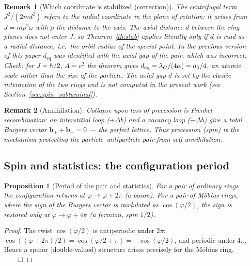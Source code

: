 \documentclass[12pt,a4paper]{article}
\newtheorem{proposition}{Proposition}
\newtheorem{remark}{Remark}
\providecommand{\lambdabar}{{\mkern0.75mu\mathchar'26\mkern-9.75mu\lambda}}
\begin{document}
\begin{remark}[Which coordinate is stabilized (correction)]
\label{rem:stab_axis}
The centrifugal term $J^2/(2md^2)$ refers to the \emph{radial} coordinate in the
plane of rotation: it arises from $J=m\rho^2\omega$ with $\rho$ the distance to
the axis. The axial distance $d$ between the ring planes does not enter $J$, so
Theorem~\ref{th:stab} applies literally only if $d$ is read as a radial distance,
i.e.\ the orbit radius of the special point. In the previous version of this paper
$d_{\text{eq}}$ was identified with the axial gap of the pair, which was incorrect.
Check: for $J=\hbar/2$, $A=e^2$ the theorem gives
$d_{\text{eq}}=\lambdabar_C/(4\alpha)=a_0/4$, an atomic scale rather than the size
of the particle. The axial gap $d$ is set by the elastic interaction of the two
rings and is not computed in the present work
(see Section~\ref{sec:spin_subluminal}).
\end{remark}

\begin{remark}[Annihilation]
Collapse upon loss of precession is Frenkel recombination: an interstitial loop
($+\Delta b$) and a vacancy loop ($-\Delta b$) give a total Burgers vector
$\mathbf{b}_++\mathbf{b}_-=0$ --- the perfect lattice. Thus precession (spin) is
the mechanism protecting the particle--antiparticle pair from self-annihilation.
\end{remark}

\subsection{Spin and statistics: the configuration period}
\begin{proposition}[Period of the pair and statistics]
For a pair of ordinary rings the configuration returns at
$\varphi\to\varphi+2\pi$ (a boson). For a pair of M\"obius rings, where the sign
of the Burgers vector is modulated as $\cos(\varphi/2)$, the sign is restored
only at $\varphi\to\varphi+4\pi$ (a fermion, spin $1/2$).
\end{proposition}
\begin{proof}
The twist $\cos(\varphi/2)$ is antiperiodic under $2\pi$:
$\cos((\varphi+2\pi)/2)=\cos(\varphi/2+\pi)=-\cos(\varphi/2)$, and periodic
under $4\pi$. Hence a spinor (double-valued) structure arises precisely for the
M\"obius ring. $\qed$
\end{proof}
\end{document}
